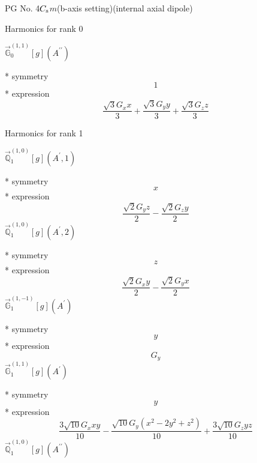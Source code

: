 \documentclass[fleqn,8pt]{jsarticle}
\begin{document}
\setcounter{MaxMatrixCols}{32}

\renewcommand{\tablename}{Table~}
\renewcommand{\figurename}{Figure~}
\begin{center}
\LARGE
PG No. 4\quad$C_{\rm s}$\quad$m$\quad(b-axis setting)\quad[ monoclinic ] (internal axial dipole)
\end{center}

\noindent * Harmonics for rank 0

\noindent\quad $\vec{\mathbb{G}}_{0}^{(1,1)}[g](A^{\prime\prime})$

\noindent\quad ** symmetry
\begin{dmath*}
1
\end{dmath*}
\noindent\quad ** expression
\begin{dmath*}
\frac{\sqrt{3} G_{x} x}{3} + \frac{\sqrt{3} G_{y} y}{3} + \frac{\sqrt{3} G_{z} z}{3}
\end{dmath*}

\noindent * Harmonics for rank 1

\noindent\quad $\vec{\mathbb{Q}}_{1}^{(1,0)}[g](A^{\prime},1)$

\noindent\quad ** symmetry
\begin{dmath*}
x
\end{dmath*}
\noindent\quad ** expression
\begin{dmath*}
\frac{\sqrt{2} G_{y} z}{2} - \frac{\sqrt{2} G_{z} y}{2}
\end{dmath*}
\noindent\quad $\vec{\mathbb{Q}}_{1}^{(1,0)}[g](A^{\prime},2)$

\noindent\quad ** symmetry
\begin{dmath*}
z
\end{dmath*}
\noindent\quad ** expression
\begin{dmath*}
\frac{\sqrt{2} G_{x} y}{2} - \frac{\sqrt{2} G_{y} x}{2}
\end{dmath*}
\noindent\quad $\vec{\mathbb{G}}_{1}^{(1,-1)}[g](A^{\prime})$

\noindent\quad ** symmetry
\begin{dmath*}
y
\end{dmath*}
\noindent\quad ** expression
\begin{dmath*}
G_{y}
\end{dmath*}
\noindent\quad $\vec{\mathbb{G}}_{1}^{(1,1)}[g](A^{\prime})$

\noindent\quad ** symmetry
\begin{dmath*}
y
\end{dmath*}
\noindent\quad ** expression
\begin{dmath*}
\frac{3 \sqrt{10} G_{x} x y}{10} - \frac{\sqrt{10} G_{y} \left(x^{2} - 2 y^{2} + z^{2}\right)}{10} + \frac{3 \sqrt{10} G_{z} y z}{10}
\end{dmath*}
\noindent\quad $\vec{\mathbb{Q}}_{1}^{(1,0)}[g](A^{\prime\prime})$
\end{document}
